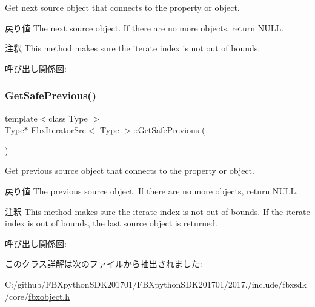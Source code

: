 Get next source object that connects to the property or object. \begin{DoxyReturn}{戻り値}
The next source object. If there are no more objects, return N\+U\+LL. 
\end{DoxyReturn}
\begin{DoxyRemark}{注釈}
This method makes sure the iterate index is not out of bounds. 
\end{DoxyRemark}
呼び出し関係図\+:
\mbox{\label{class_fbx_iterator_src_adc197165ab59e507a6aa84283c0a821b}} 
\subsubsection{\texorpdfstring{Get\+Safe\+Previous()}{GetSafePrevious()}}
{\footnotesize\ttfamily template$<$class Type $>$ \\
Type$\ast$ \hyperlink{class_fbx_iterator_src}{Fbx\+Iterator\+Src}$<$ Type $>$\+::Get\+Safe\+Previous (\begin{DoxyParamCaption}{ }\end{DoxyParamCaption})}

Get previous source object that connects to the property or object. \begin{DoxyReturn}{戻り値}
The previous source object. If there are no more objects, return N\+U\+LL. 
\end{DoxyReturn}
\begin{DoxyRemark}{注釈}
This method makes sure the iterate index is not out of bounds. If the iterate index is out of bounds, the last source object is returned. 
\end{DoxyRemark}
呼び出し関係図\+:


このクラス詳解は次のファイルから抽出されました\+:\begin{DoxyCompactItemize}
\item 
C\+:/github/\+F\+B\+Xpython\+S\+D\+K201701/\+F\+B\+Xpython\+S\+D\+K201701/2017./include/fbxsdk/core/\hyperlink{fbxobject_8h}{fbxobject.\+h}\end{DoxyCompactItemize}
